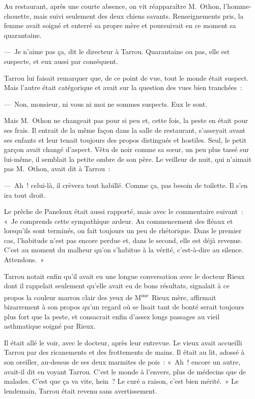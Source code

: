\documentclass[french,twoside]{book} %
\begin{document}
Au restaurant, après une courte absence, on vit réapparaître M. Othon, l’homme-chouette, mais suivi seulement des deux chiens savants. Renseignements pris, la femme avait soigné et enterré sa propre mère et poursuivait en ce moment sa quarantaine.\par
— Je n’aime pas ça, dit le directeur à Tarrou. Quarantaine ou pas, elle est suspecte, et eux aussi par conséquent.\par
Tarrou lui faisait remarquer que, de ce point de vue, tout le monde était suspect. Mais l’autre était catégorique et avait sur la question des vues bien tranchées :\par
— Non, monsieur, ni vous ni moi ne sommes suspects. Eux le sont.\par
Mais M. Othon ne changeait pas pour si peu et, cette fois, la peste en était pour ses frais. Il entrait de la même façon dans la salle de restaurant, s’asseyait avant ses enfants et leur tenait toujours des propos distingués et hostiles. Seul, le petit garçon avait changé d’aspect. Vêtu de noir comme sa sœur, un peu plus tassé sur lui-même, il semblait la petite ombre de son père. Le veilleur de nuit, qui n’aimait pas M. Othon, avait dit à Tarrou :\par
— Ah ! celui-là, il crèvera tout habillé. Comme ça, pas besoin de toilette. Il s’en ira tout droit.\par
Le prêche de Paneloux était aussi rapporté, mais avec le commentaire suivant : « Je comprends cette sympathique ardeur. Au commencement des fléaux et lorsqu’ils sont terminés, on fait toujours un peu de rhétorique. Dans le premier cas, l’habitude n’est pas encore perdue et, dans le second, elle est déjà revenue. C’est au moment du malheur qu’on s’habitue à la vérité, c’est-à-dire au silence. Attendons. »\par
Tarrou notait enfin qu’il avait eu une longue conversation avec le docteur Rieux dont il rappelait seulement qu’elle avait eu de bons résultats, signalait à ce propos la couleur marron clair des yeux de M\textsuperscript{me} Rieux mère, affirmait bizarrement à son propos qu’un regard où se lisait tant de bonté serait toujours plus fort que la peste, et consacrait enfin d’assez longs passages au vieil asthmatique soigné par Rieux.\par
Il était allé le voir, avec le docteur, après leur entrevue. Le vieux avait accueilli Tarrou par des ricanements et des frottements de mains. Il était au lit, adossé à son oreiller, au-dessus de ses deux marmites de pois : « Ah ! encore un autre, avait-il dit en voyant Tarrou. C’est le monde à l’envers, plus de médecins que de malades. C’est que ça va vite, hein ? Le curé a raison, c’est bien mérité. » Le lendemain, Tarrou était revenu sans avertissement.\par
\end{document}

